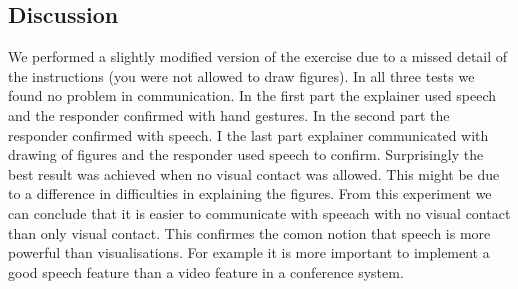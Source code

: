 \documentclass[10pt, a4paper]{article}
\begin{document}
\subsection{Discussion}
We performed a slightly modified version of the exercise due to a missed detail of the instructions (you were not allowed to draw figures). In all three tests we found no problem in communication. In the first part the explainer used speech and the responder confirmed with hand gestures. In the second part the responder confirmed with speech. I the last part explainer communicated with drawing of figures and the responder used speech to confirm. Surprisingly the best result was achieved when no visual contact was allowed. This might be due to a difference in difficulties in explaining the figures. From this experiment we can conclude that it is easier to communicate with speeach with no visual contact than only visual contact. This confirmes the comon notion that speech is more powerful than visualisations. For example it is more important to implement a good speech feature than a video feature in a conference system.

%
%
\end{document}

